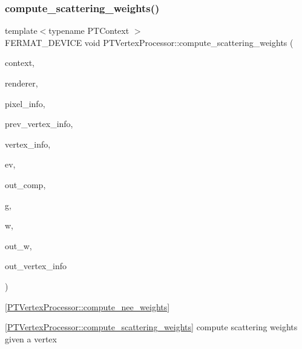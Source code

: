 \subsubsection{\texorpdfstring{compute\+\_\+scattering\+\_\+weights()}{compute\_scattering\_weights()}}
{\footnotesize\ttfamily template$<$typename P\+T\+Context $>$ \\
F\+E\+R\+M\+A\+T\+\_\+\+D\+E\+V\+I\+CE void P\+T\+Vertex\+Processor\+::compute\+\_\+scattering\+\_\+weights (\begin{DoxyParamCaption}\item[{const P\+T\+Context \&}]{context,  }\item[{const \hyperlink{struct_rendering_context_view}{Rendering\+Context\+View} \&}]{renderer,  }\item[{const \hyperlink{union_pixel_info}{Pixel\+Info}}]{pixel\+\_\+info,  }\item[{const uint32}]{prev\+\_\+vertex\+\_\+info,  }\item[{const uint32}]{vertex\+\_\+info,  }\item[{const \hyperlink{struct_eye_vertex}{Eye\+Vertex} \&}]{ev,  }\item[{const uint32}]{out\+\_\+comp,  }\item[{const \hyperlink{structcugar_1_1_vector}{cugar\+::\+Vector3f} \&}]{g,  }\item[{const \hyperlink{structcugar_1_1_vector}{cugar\+::\+Vector3f} \&}]{w,  }\item[{\hyperlink{structcugar_1_1_vector}{cugar\+::\+Vector3f} \&}]{out\+\_\+w,  }\item[{uint32 \&}]{out\+\_\+vertex\+\_\+info }\end{DoxyParamCaption})\hspace{0.3cm}{\ttfamily [inline]}}



\mbox{[}\hyperlink{struct_p_t_vertex_processor_acca5b26b69481a1fada796bac4588b9b}{P\+T\+Vertex\+Processor\+::compute\+\_\+nee\+\_\+weights}\mbox{]} 

\mbox{[}\hyperlink{struct_p_t_vertex_processor_a832bbbc566d333cd7a0789690f5f7c62}{P\+T\+Vertex\+Processor\+::compute\+\_\+scattering\+\_\+weights}\mbox{]} compute scattering weights given a vertex


